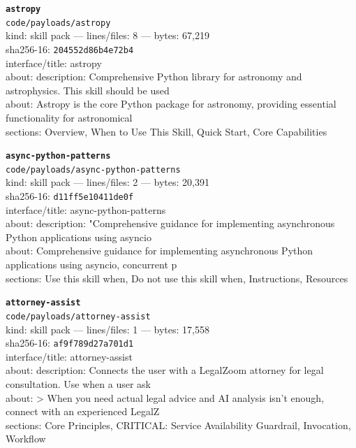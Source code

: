 \noindent\textbf{\texttt{astropy}}\\
\texttt{code/payloads/astropy}\\
kind: skill pack --- lines/files: 8 --- bytes: 67,219\\
sha256-16: \texttt{204552d86b4e72b4}\\
interface/title: astropy\\
about: description: Comprehensive Python library for astronomy and astrophysics. This skill should be used \\
about: Astropy is the core Python package for astronomy, providing essential functionality for astronomical\\
sections: Overview, When to Use This Skill, Quick Start, Core Capabilities\\
\vspace*{6.0pt}

\noindent\textbf{\texttt{async-python-patterns}}\\
\texttt{code/payloads/async-python-patterns}\\
kind: skill pack --- lines/files: 2 --- bytes: 20,391\\
sha256-16: \texttt{d11ff5e10411de0f}\\
interface/title: async-python-patterns\\
about: description: "Comprehensive guidance for implementing asynchronous Python applications using asyncio\\
about: Comprehensive guidance for implementing asynchronous Python applications using asyncio, concurrent p\\
sections: Use this skill when, Do not use this skill when, Instructions, Resources\\
\vspace*{6.0pt}

\noindent\textbf{\texttt{attorney-assist}}\\
\texttt{code/payloads/attorney-assist}\\
kind: skill pack --- lines/files: 1 --- bytes: 17,558\\
sha256-16: \texttt{af9f789d27a701d1}\\
interface/title: attorney-assist\\
about: description: Connects the user with a LegalZoom attorney for legal consultation. Use when a user ask\\
about: > When you need actual legal advice and AI analysis isn't enough, connect with an experienced LegalZ\\
sections: Core Principles, CRITICAL: Service Availability Guardrail, Invocation, Workflow\\
\vspace*{6.0pt}

